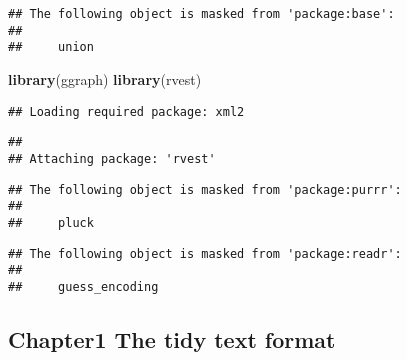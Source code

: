 \documentclass[]{article}
\newenvironment{Shaded}{\begin{snugshade}}{\end{snugshade}}
\newcommand{\KeywordTok}[1]{\textcolor[rgb]{0.13,0.29,0.53}{\textbf{{#1}}}}
\newcommand{\DataTypeTok}[1]{\textcolor[rgb]{0.13,0.29,0.53}{{#1}}}
\newcommand{\CharTok}[1]{\textcolor[rgb]{0.31,0.60,0.02}{{#1}}}
\newcommand{\StringTok}[1]{\textcolor[rgb]{0.31,0.60,0.02}{{#1}}}
\newcommand{\NormalTok}[1]{{#1}}
\begin{document}
\begin{verbatim}
## The following object is masked from 'package:base':
## 
##     union
\end{verbatim}

\begin{Shaded}
\begin{Highlighting}[]
\KeywordTok{library}\NormalTok{(ggraph)}
\KeywordTok{library}\NormalTok{(rvest)}
\end{Highlighting}
\end{Shaded}

\begin{verbatim}
## Loading required package: xml2
\end{verbatim}

\begin{verbatim}
## 
## Attaching package: 'rvest'
\end{verbatim}

\begin{verbatim}
## The following object is masked from 'package:purrr':
## 
##     pluck
\end{verbatim}

\begin{verbatim}
## The following object is masked from 'package:readr':
## 
##     guess_encoding
\end{verbatim}

\begin{Shaded}
\end{Shaded}

\subsection{Chapter1 The tidy text
format}\label{chapter1-the-tidy-text-format}
\end{document}
